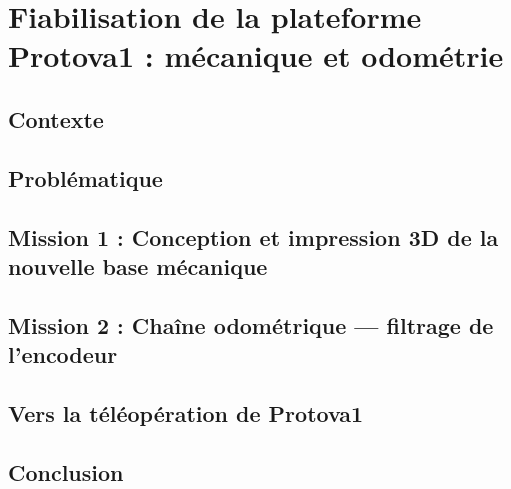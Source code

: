 \chapter{Fiabilisation de la plateforme Protova1 : mécanique et odométrie}
\chapminitoc

\section{Contexte}

\section{Problématique}

\section{Mission 1 : Conception et impression 3D de la nouvelle base mécanique}
\objectif
\methodes
\resultats
\discussion

\section{Mission 2 : Chaîne odométrique --- filtrage de l'encodeur}
\objectif
\methodes
\resultats
\discussion

\section{Vers la téléopération de Protova1}

\section{Conclusion}
